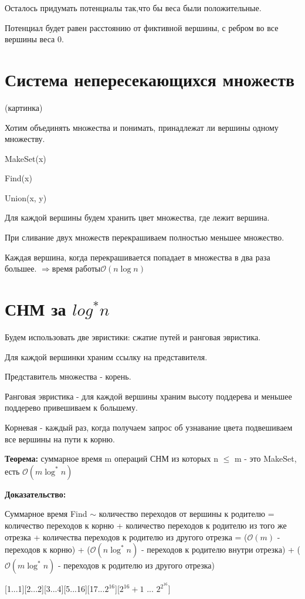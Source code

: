 \documentclass[12pt]{article}
\def\O{\mathcal{O}}
\begin{document}
Осталось придумать потенциалы так,что бы веса были положительные. 

Потенциал будет равен расстоянию от фиктивной вершины, с ребром во все вершины веса 0.

\section{Система непересекающихся множеств}
(картинка)

Хотим объединять множества и понимать, принадлежат ли вершины одному множеству.

MakeSet(x)

Find(x)

Union(x, y)

Для каждой вершины будем хранить цвет множества, где лежит вершина.

При сливание двух множеств перекрашиваем полностью меньшее множество. 

Каждая вершина, когда перекрашивается попадает в множества в два раза большее. $\Rightarrow \text{время работы} \O(n \log n)$

\section{СНМ за $log^*n$}

Будем использовать две эвристики: сжатие путей и ранговая эвристика.

Для каждой вершинки храним ссылку на представителя. 

Представитель множества - корень.

Ранговая эвристика - для каждой вершины храним высоту поддерева и меньшее поддерево привешиваем к большему.

Корневая - каждый раз, когда получаем запрос об узнавание цвета подвешиваем все вершины на пути к корню.

{\bf Теорема:} суммарное время m операций СНМ из которых n $\le$  m - это MakeSet, есть $\O(m \log^* n)$

{\bf Доказательство:}
 
Суммарное время Find $\sim$ количество переходов от вершины к родителю = количество переходов к корню + количество переходов к родителю из того же отрезка + количества переходов к родителю из другого отрезка = ($\O(m)$ - переходов к корню) + ($\O(n \log^* n)$ - переходов к родителю внутри отрезка) + ($\O(m \log^* n)$ - переходов к родителю из другого отрезка)

[1...1][2...2][3...4][5...16][17...$2^{16}$][$2^{16} + 1$ ... $2^{2^{16}}$]
\end{document}
